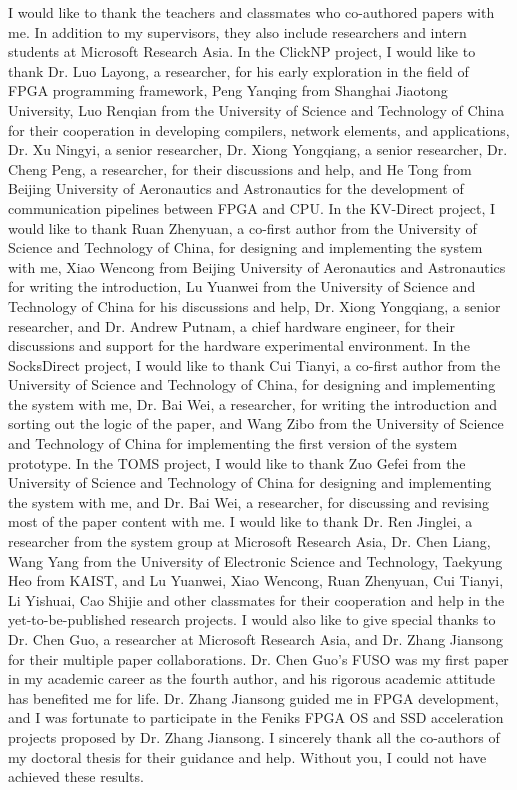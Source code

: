 \begin{acknowledgements}
I would like to thank the teachers and classmates who co-authored papers with me. In addition to my supervisors, they also include researchers and intern students at Microsoft Research Asia. In the ClickNP project, I would like to thank Dr. Luo Layong, a researcher, for his early exploration in the field of FPGA programming framework, Peng Yanqing from Shanghai Jiaotong University, Luo Renqian from the University of Science and Technology of China for their cooperation in developing compilers, network elements, and applications, Dr. Xu Ningyi, a senior researcher, Dr. Xiong Yongqiang, a senior researcher, Dr. Cheng Peng, a researcher, for their discussions and help, and He Tong from Beijing University of Aeronautics and Astronautics for the development of communication pipelines between FPGA and CPU. In the KV-Direct project, I would like to thank Ruan Zhenyuan, a co-first author from the University of Science and Technology of China, for designing and implementing the system with me, Xiao Wencong from Beijing University of Aeronautics and Astronautics for writing the introduction, Lu Yuanwei from the University of Science and Technology of China for his discussions and help, Dr. Xiong Yongqiang, a senior researcher, and Dr. Andrew Putnam, a chief hardware engineer, for their discussions and support for the hardware experimental environment. In the SocksDirect project, I would like to thank Cui Tianyi, a co-first author from the University of Science and Technology of China, for designing and implementing the system with me, Dr. Bai Wei, a researcher, for writing the introduction and sorting out the logic of the paper, and Wang Zibo from the University of Science and Technology of China for implementing the first version of the system prototype. In the TOMS project, I would like to thank Zuo Gefei from the University of Science and Technology of China for designing and implementing the system with me, and Dr. Bai Wei, a researcher, for discussing and revising most of the paper content with me. I would like to thank Dr. Ren Jinglei, a researcher from the system group at Microsoft Research Asia, Dr. Chen Liang, Wang Yang from the University of Electronic Science and Technology, Taekyung Heo from KAIST, and Lu Yuanwei, Xiao Wencong, Ruan Zhenyuan, Cui Tianyi, Li Yishuai, Cao Shijie and other classmates for their cooperation and help in the yet-to-be-published research projects. I would also like to give special thanks to Dr. Chen Guo, a researcher at Microsoft Research Asia, and Dr. Zhang Jiansong for their multiple paper collaborations. Dr. Chen Guo's FUSO was my first paper in my academic career as the fourth author, and his rigorous academic attitude has benefited me for life. Dr. Zhang Jiansong guided me in FPGA development, and I was fortunate to participate in the Feniks FPGA OS and SSD acceleration projects proposed by Dr. Zhang Jiansong. I sincerely thank all the co-authors of my doctoral thesis for their guidance and help. Without you, I could not have achieved these results.


\end{acknowledgements}
